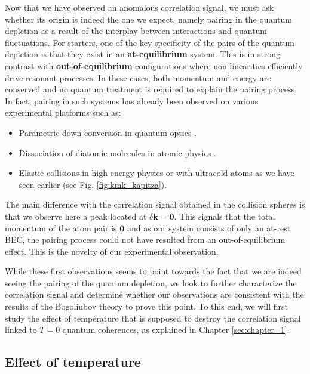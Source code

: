 Now that we have observed an anomalous correlation signal, we must ask whether its origin is indeed the one we expect, namely \kmk pairing in the quantum depletion as a result of the interplay between interactions and quantum fluctuations. For starters, one of the key specificity of the \kmk pairs of the quantum depletion is that they exist in an \textbf{at-equilibrium} system. This is in strong contrast with \textbf{out-of-equilibrium} configurations where non linearities efficiently drive resonant processes. In these cases, both momentum and energy are conserved and no quantum treatment is required to explain the pairing process. In fact, \kmk pairing in such systems has already been observed on various experimental platforms such as:

\begin{itemize}
    \item Parametric down conversion in quantum optics \cite{burnham1970}.
    \item Dissociation of diatomic molecules in atomic physics \cite{greiner2005}.
    \item Elastic collisions in high energy physics \cite{arnison1982} or with ultracold atoms \cite{perrin2007observation} as we have seen earlier (see Fig.-\ref{fig:kmk_kapitza}).
\end{itemize}

The main difference with the \kmk correlation signal obtained in the collision spheres is that we observe here a peak located at $\delta \bm{k} = \bm{0}$. This signals that the total momentum of the atom pair is $\bm{0}$ and as our system consists of only an at-rest BEC, the pairing process could not have resulted from an out-of-equilibrium effect. This is the novelty of our experimental observation.

While these first observations seems to point towards the fact that we are indeed seeing the \kmk pairing of the quantum depletion, we look to further characterize the correlation signal and determine whether our observations are consistent with the results of the Bogoliubov theory to prove this point. To this end, we will first study the effect of temperature that is supposed to destroy the \kmk correlation signal linked to $T=0$ quantum coherences, as explained in Chapter \ref{sec:chapter_1}.





\subsection{Effect of temperature}

